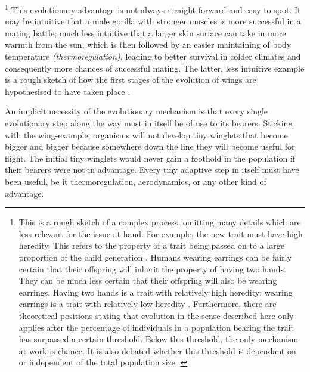 \footnote{This is a rough sketch of a complex process, omitting many details which are less relevant for the issue at hand.
For example, the new trait must have high heredity. This refers to the property of a trait being passed on to a large proportion of the child generation \citep{king_heredity_2013}.
Humans wearing earrings can be fairly certain that their offspring will inherit the property of having two hands.
They can be much less certain that their offspring will also be wearing earrings.
Having two hands is a trait with relatively high heredity; wearing earrings is a trait with relatively low heredity \citep[]{sapolsky_behave_2017}.
Furthermore, there are theoretical positions stating that evolution in the sense described here only applies after the percentage of individuals in a population bearing the trait has surpassed a certain threshold.
Below this threshold, the only mechanism at work is chance.
It is also debated whether this threshold is dependant on or independent of the total population size \citep[,]{berwick_why_2016,gillespie_population_2010}.}
This evolutionary advantage is not always straight-forward and easy to spot.
It may be intuitive that a male gorilla with stronger muscles is more successful in a mating battle; much less intuitive that a larger skin surface can take in more warmth from the sun, which is then followed by an easier maintaining of body temperature \emph{(thermoregulation),} leading to better survival in colder climates and consequently more chances of successful mating.
The latter, less intuitive example is a rough sketch of how the first stages of the evolution of wings are hypothesised to have taken place \citep{douglas_thermoregulatory_1981,kingsolver_aerodynamics_1985}.

An implicit necessity of the evolutionary mechanism is that every single evolutionary step along the way must in itself be of use to its bearers.
Sticking with the wing-example, organisms will not develop tiny winglets that become bigger and bigger because somewhere down the line they will become useful for flight.
The initial tiny winglets would never gain a foothold in the population if their bearers were not in advantage.
Every tiny adaptive step in itself must have been useful, be it thermoregulation, aerodynamics, or any other kind of advantage.

